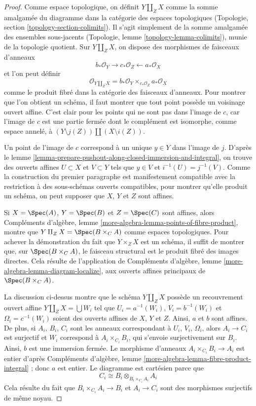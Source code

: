 \begin{proof}
Comme espace topologique, on définit $Y \amalg_Z X$ comme la somme amalgamée du
diagramme dans la catégorie des espaces topologiques (Topologie, section
\ref{topology-section-colimits}). Il s'agit simplement de la somme amalgamée
des ensembles sous-jacents (Topologie, lemme \ref{topology-lemma-colimits}),
munie de la topologie quotient.
Sur $Y \amalg_Z X$, on dispose des morphismes de faisceaux d'anneaux
$$
b_*\mathcal{O}_Y \longrightarrow c_*\mathcal{O}_Z
\longleftarrow a_*\mathcal{O}_X
$$
et l'on peut définir
$$
\mathcal{O}_{Y \amalg_Z X} =
b_*\mathcal{O}_Y \times_{c_*\mathcal{O}_Z} a_*\mathcal{O}_X
$$
comme le produit fibré dans la catégorie des faisceaux d'anneaux. Pour montrer que l'on
obtient un schéma, il faut montrer que tout point possède un
voisinage ouvert affine. C'est clair pour les points qui ne sont pas dans l'image de $c$,
car l'image de $c$ est une partie fermée dont le complément est
isomorphe, comme espace annelé, à $(Y \setminus j(Z)) \amalg (X \setminus i(Z))$.

\medskip\noindent
Un point de l'image de $c$ correspond à un unique $y \in Y$
dans l'image de $j$. D'après le
lemme \ref{lemma-prepare-pushout-along-closed-immersion-and-integral},
on trouve des ouverts affines $U \subset X$ et $V \subset Y$ tels que
$y \in V$ et $i^{-1}(U) = j^{-1}(V)$.
Comme la construction du premier paragraphe est manifestement compatible
avec la restriction à des sous-schémas ouverts compatibles, pour montrer qu'elle
produit un schéma, on peut supposer que $X$, $Y$ et $Z$ sont affines.

\medskip\noindent
Si $X = \Spec(A)$, $Y = \Spec(B)$ et $Z = \Spec(C)$ sont affines, alors
Compléments d'algèbre, lemme \ref{more-algebra-lemma-points-of-fibre-product},
montre que $Y \amalg_Z X = \Spec(B \times_C A)$ comme espaces topologiques.
Pour achever la démonstration du fait que $Y \times_Z X$ est un schéma, il suffit de montrer
que, sur $\Spec(B \times_C A)$, le faisceau structural est le produit fibré
des images directes. Cela résulte de l'application de
Compléments d'algèbre, lemme \ref{more-algebra-lemma-diagram-localize},
aux ouverts affines principaux de $\Spec(B \times_C A)$.

\medskip\noindent
La discussion ci-dessus montre que le schéma $Y \amalg_Z X$
possède un recouvrement ouvert affine $Y \amalg_Z X = \bigcup W_i$
tel que $U_i = a^{-1}(W_i)$, $V_i = b^{-1}(W_i)$ et
$\Omega_i = c^{-1}(W_i)$ soient des ouverts affines de $X$, $Y$ et $Z$.
Ainsi, $a$ et $b$ sont affines.
De plus, si $A_i$, $B_i$, $C_i$ sont les anneaux correspondant à
$U_i$, $V_i$, $\Omega_i$, alors $A_i \to C_i$ est surjectif et
$W_i$ correspond à $A_i \times_{C_i} B_i$, qui s'envoie surjectivement sur
$B_i$. Ainsi, $b$ est une immersion fermée.
Le morphisme d'anneaux $A_i \times_{C_i} B_i \to A_i$ est entier d'après
Compléments d'algèbre, lemme \ref{more-algebra-lemma-fibre-product-integral} ;
donc $a$ est entier. Le diagramme est cartésien parce que
$$
C_i \cong B_i \otimes_{B_i \times_{C_i} A_i} A_i
$$
Cela résulte du fait que $B_i \times_{C_i} A_i \to B_i$
et $A_i \to C_i$ sont des morphismes surjectifs de même noyau.


\end{proof}
